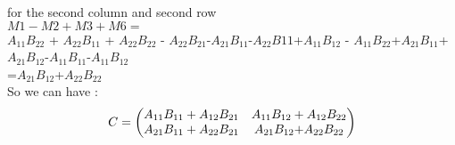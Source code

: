 \documentclass{article}
\begin{document}
for the second column and second row\\
$M1-M2+M3+M6=$\\
\sout{$A_{11}B_{22}$} + \sout{$A_{22}B_{11}$} + $A_{22}B_{22}$ - \sout{$A_{22}B_{21}$}-\sout{$A_{21}B_{11}$}-\sout{$A_{22}B{11}$}+\sout{$A_{11}B_{12}$} - \sout{$A_{11}B_{22}$}+\sout{$A_{21}B_{11}$}+$A_{21}B_{12}$-\sout{$A_{11}B_{11}$}-\sout{$A_{11}B_{12}$}\\=$A_{21}B_{12}$+$A_{22}B_{22}$\\
So we can have :\\
\begin{equation*}
C=
    \begin{pmatrix}
    A_{11}B_{11}+A_{12}B_{21}& A_{11}B_{12} + A_{12}B_{22}\\
    A_{21}B_{11}+A_{22}B_{21}& A_{21}B_{12}$+$A_{22}B_{22}\\
    \end{pmatrix}
\end{equation*}
\end{document}
